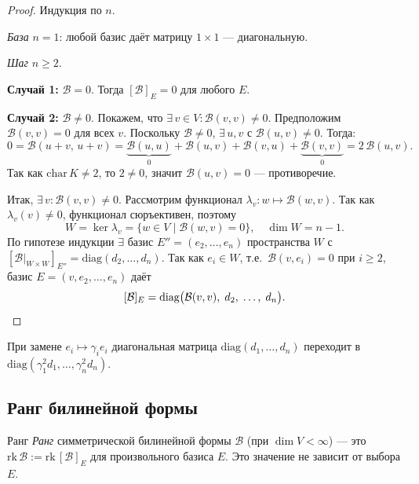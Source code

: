 \begin{proof}
	Индукция по $n$.
	
	\textit{База} $n = 1$: любой базис даёт матрицу $1 \times 1$ — диагональную.
	
	\textit{Шаг} $n \geq 2$.
	
	\textbf{Случай 1:} $\mathcal{B} = 0$. Тогда $[\mathcal{B}]_E = 0$ для любого $E$.
	
	\textbf{Случай 2:} $\mathcal{B} \neq 0$.
	Покажем, что $\exists\, v \in V\colon \mathcal{B}(v,v) \neq 0$.
	Предположим $\mathcal{B}(v,v) = 0$ для всех $v$.
	Поскольку $\mathcal{B} \neq 0$, $\exists\, u, v$ с $\mathcal{B}(u,v) \neq 0$. Тогда:
	\[
	0 = \mathcal{B}(u+v,\,u+v)
	= \underbrace{\mathcal{B}(u,u)}_{0} + \mathcal{B}(u,v) + \mathcal{B}(v,u) + \underbrace{\mathcal{B}(v,v)}_{0}
	= 2\,\mathcal{B}(u,v).
	\]
	Так как $\mathrm{char}\,K \neq 2$, то $2 \neq 0$, значит $\mathcal{B}(u,v) = 0$ — противоречие.
	
	Итак, $\exists\, v\colon \mathcal{B}(v,v) \neq 0$. Рассмотрим функционал $\lambda_v\colon w \mapsto \mathcal{B}(w, v)$.
	Так как $\lambda_v(v) \neq 0$, функционал сюръективен, поэтому
	\[
	W = \ker\lambda_v = \{w \in V \mid \mathcal{B}(w,v)=0\}, \quad \dim W = n-1.
	\]
	По гипотезе индукции $\exists$ базис $E'' = (e_2,\ldots,e_n)$ пространства $W$ с
	$[\mathcal{B}|_{W\times W}]_{E''} = \mathrm{diag}(d_2,\ldots,d_n)$.
	Так как $e_i \in W$, т.е.\ $\mathcal{B}(v,e_i) = 0$ при $i \geq 2$, базис $E = (v, e_2, \ldots, e_n)$ даёт
	\[
	[\mathcal{B}]_E = \mathrm{diag}\bigl(\mathcal{B}(v,v),\; d_2,\; \ldots,\; d_n\bigr). \qedhere
	\]
\end{proof}

\begin{Remark}{}{}
	При замене $e_i \mapsto \gamma_i e_i$ диагональная матрица $\mathrm{diag}(d_1,\ldots,d_n)$ переходит в $\mathrm{diag}(\gamma_1^2 d_1,\ldots,\gamma_n^2 d_n)$.
\end{Remark}

\subsection{Ранг билинейной формы}

\begin{Definition}{Ранг}{}
	\textit{Ранг} симметрической билинейной формы $\mathcal{B}$ (при $\dim V < \infty$) — это $\mathrm{rk}\,\mathcal{B} := \mathrm{rk}\,[\mathcal{B}]_E$ для произвольного базиса $E$. Это значение не зависит от выбора $E$.
\end{Definition}

